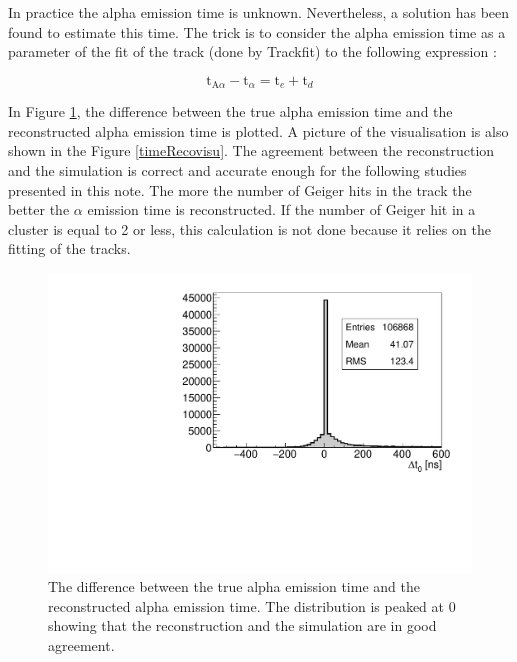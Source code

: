 \documentclass[main.tex]{subfiles}
\begin{document}
\noindent In practice the alpha emission time is unknown. Nevertheless, a solution has been found to estimate this time. The trick is to consider the alpha emission time as a parameter of the fit of the track (done by Trackfit) to the following expression :


$$\text{t}_{\text{A}\alpha} - \text{t}_\alpha =  \text{t}_e  + \text{t}_d$$


\noindent In Figure \ref{timeReco}, the difference between the true alpha emission time and the reconstructed alpha emission time is plotted. A picture of the visualisation is also shown in the Figure \ref{timeRecovisu}. The agreement between the reconstruction and the simulation is correct and accurate enough for the following studies presented in this note. The more the number of Geiger hits in the track the better the $\alpha$ emission time is reconstructed. If the number of Geiger hit in a cluster is equal to 2 or less, this calculation is not done because it relies on the fitting of the tracks. 


\begin{figure}[h!]
\begin{center}
\includegraphics[scale=0.55]{pictures/Chap5/delta_time_simu_reco.pdf}
\caption{The difference between the true alpha emission time and the reconstructed alpha emission time. The distribution is peaked at 0 showing that the reconstruction and the simulation are in good agreement.}
\label{timeReco}
\end{center}
\end{figure}
\end{document}
